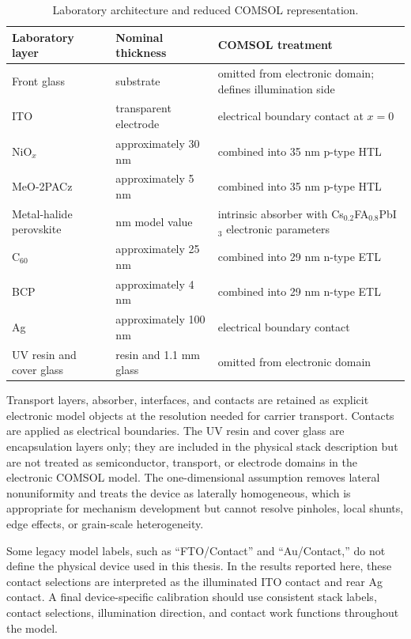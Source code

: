 \begin{table}[H]
\centering
\caption{Laboratory architecture and reduced COMSOL representation.}
\label{tab:lab_comsol_stack}
\begin{tabular}{
>{\raggedright\arraybackslash}p{}
>{\raggedright\arraybackslash}p{}
>{\raggedright\arraybackslash}p{}}
\toprule
Laboratory layer & Nominal thickness & COMSOL treatment \\
\midrule
Front glass & substrate & omitted from electronic domain; defines illumination side \\
ITO & transparent electrode & electrical boundary contact at $x=0$ \\
NiO$_x$ & approximately 30 nm & combined into 35 nm p-type HTL \\
MeO-2PACz & approximately 5 nm & combined into 35 nm p-type HTL \\
Metal-halide perovskite & 450 nm model value & intrinsic absorber with Cs$_{0.2}$FA$_{0.8}$PbI$_3$ electronic parameters \\
C$_{60}$ & approximately 25 nm & combined into 29 nm n-type ETL \\
BCP & approximately 4 nm & combined into 29 nm n-type ETL \\
Ag & approximately 100 nm & electrical boundary contact \\
UV resin and cover glass & resin and 1.1 mm glass & omitted from electronic domain \\
\bottomrule
\end{tabular}
\end{table}

Transport layers, absorber, interfaces, and contacts are retained as explicit
electronic model objects at the resolution needed for carrier transport.
Contacts are applied as electrical boundaries. The UV resin and cover glass are
encapsulation layers only; they are included in the physical stack description
but are not treated as semiconductor, transport, or electrode domains in the
electronic COMSOL model. The
one-dimensional assumption removes lateral nonuniformity and treats the device
as laterally homogeneous, which is appropriate for mechanism development but
cannot resolve pinholes, local shunts, edge effects, or grain-scale
heterogeneity.

Some legacy model labels, such as ``FTO/Contact'' and ``Au/Contact,'' do not
define the physical device used in this thesis. In the results reported here,
these contact selections are interpreted as the illuminated ITO contact and
rear Ag contact. A final device-specific calibration should use consistent
stack labels, contact selections, illumination direction, and contact work
functions throughout the model.

